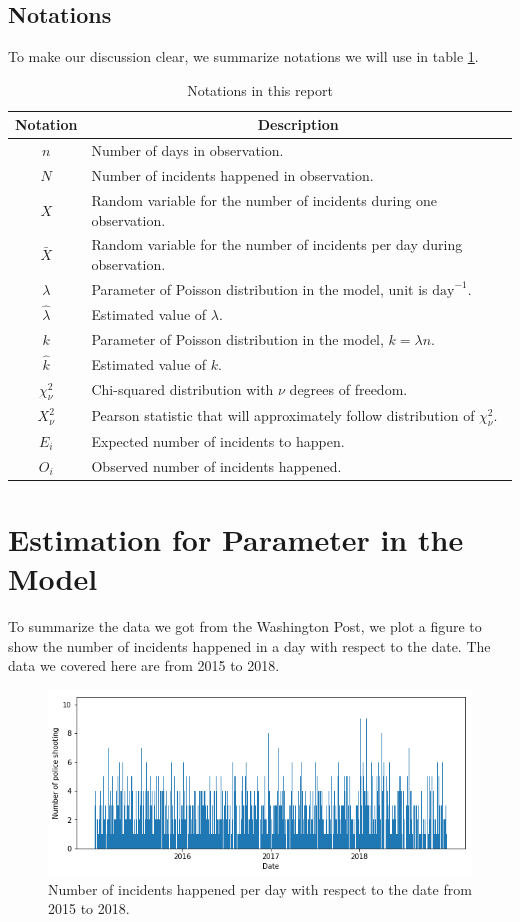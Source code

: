 \documentclass[11pt,a4paper,english]{article}
\begin{document}
\subsection{Notations}
To make our discussion clear, we summarize notations we will use in table \ref{tab:notation}.
\begin{table}[htbp]
	\centering
	\begin{tabular}{cl}
		\toprule
		Notation & \multicolumn{1}{c}{Description}\\
		\midrule
		$n$ & Number of days in observation.\\
		$N$ & Number of incidents happened in observation.\\
		$X$ & Random variable for the number of incidents during one observation.\\
		$\bar{X}$ & Random variable for the number of incidents per day during observation.\\
		$\lambda$ & Parameter of Poisson distribution in the model, unit is $\text{day}^{-1}$.\\
		$\hat{\lambda}$ & Estimated value of $\lambda$.\\
		$k$ & Parameter of Poisson distribution in the model, $k = \lambda n$.\\
		$\hat{k}$ & Estimated value of $k$.\\
		$\chi_{\nu}^{2}$ & Chi-squared distribution with $\nu$ degrees of freedom.\\
		$X^{2}_{\nu}$ & Pearson statistic that will approximately follow distribution of $\chi^{2}_{\nu}$.\\
		$E_{i}$ & Expected number of incidents to happen.\\
		$O_{i}$ & Observed number of incidents happened.\\
		\bottomrule
	\end{tabular}
	\caption{Notations in this report}
	\label{tab:notation}
\end{table}

\section{Estimation for Parameter in the Model}
To summarize the data we got from the Washington Post, we plot a figure to show the number of incidents happened in a day with respect to the date. The data we covered here are from 2015 to 2018.
\begin{figure}[htbp]
	\centering
	\includegraphics[width=\textwidth]{1.png}
    \caption{Number of incidents happened per day with respect to the date from 2015 to 2018.}
\end{figure}
\end{document}
